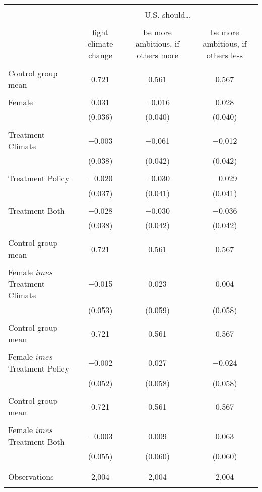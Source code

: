 
\begin{tabular}{@{\extracolsep{5pt}}lccc} 
\\[-1.8ex]\hline 
\hline \\[-1.8ex] 
 & \multicolumn{3}{c}{U.S. should… } \\ 
\cline{2-4} 
\\[-1.8ex] & fight climate change & be more ambitious, if others more & be more ambitious, if others less \\ 
\hline \\[-1.8ex] 
 Control group mean & 0.721 & 0.561 & 0.567  \\ \hline \\[-1.8ex] Female & 0.031 & $-$0.016 & 0.028 \\ 
  & (0.036) & (0.040) & (0.040) \\ 
  & & & \\ 
 Treatment Climate & $-$0.003 & $-$0.061 & $-$0.012 \\ 
  & (0.038) & (0.042) & (0.042) \\ 
  & & & \\ 
 Treatment Policy & $-$0.020 & $-$0.030 & $-$0.029 \\ 
  & (0.037) & (0.041) & (0.041) \\ 
  & & & \\ 
 Treatment Both & $-$0.028 & $-$0.030 & $-$0.036 \\ 
  & (0.038) & (0.042) & (0.042) \\ 
  & & & \\ 
 Control group mean & 0.721 & 0.561 & 0.567  \\ \hline \\[-1.8ex] Female $	imes$ Treatment Climate & $-$0.015 & 0.023 & 0.004 \\ 
  & (0.053) & (0.059) & (0.058) \\ 
  & & & \\ 
 Control group mean & 0.721 & 0.561 & 0.567  \\ \hline \\[-1.8ex] Female $	imes$ Treatment Policy & $-$0.002 & 0.027 & $-$0.024 \\ 
  & (0.052) & (0.058) & (0.058) \\ 
  & & & \\ 
 Control group mean & 0.721 & 0.561 & 0.567  \\ \hline \\[-1.8ex] Female $	imes$ Treatment Both & $-$0.003 & 0.009 & 0.063 \\ 
  & (0.055) & (0.060) & (0.060) \\ 
  & & & \\ 
\hline \\[-1.8ex] 

Observations & 2,004 & 2,004 & 2,004 \\ 
\hline 
\hline \\[-1.8ex] 
\end{tabular} 